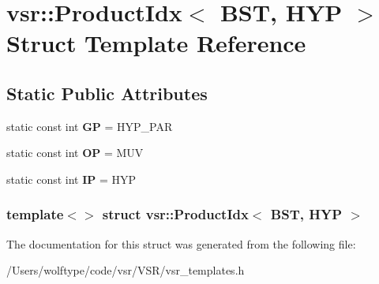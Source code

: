 \hypertarget{structvsr_1_1_product_idx_3_01_b_s_t_00_01_h_y_p_01_4}{\section{vsr\-:\-:Product\-Idx$<$ B\-S\-T, H\-Y\-P $>$ Struct Template Reference}
\label{structvsr_1_1_product_idx_3_01_b_s_t_00_01_h_y_p_01_4}
}
\subsection*{Static Public Attributes}
\begin{DoxyCompactItemize}
\item 
\hypertarget{structvsr_1_1_product_idx_3_01_b_s_t_00_01_h_y_p_01_4_abbcdeae2b8112d313e296b77e7db6af8}{static const int {\bfseries G\-P} = H\-Y\-P\-\_\-\-P\-A\-R}\label{structvsr_1_1_product_idx_3_01_b_s_t_00_01_h_y_p_01_4_abbcdeae2b8112d313e296b77e7db6af8}

\item 
\hypertarget{structvsr_1_1_product_idx_3_01_b_s_t_00_01_h_y_p_01_4_a0eb408c7926f741c1e2ba0eeba39f932}{static const int {\bfseries O\-P} = M\-U\-V}\label{structvsr_1_1_product_idx_3_01_b_s_t_00_01_h_y_p_01_4_a0eb408c7926f741c1e2ba0eeba39f932}

\item 
\hypertarget{structvsr_1_1_product_idx_3_01_b_s_t_00_01_h_y_p_01_4_a0a3de90c21991f428b1f8947fb6765b9}{static const int {\bfseries I\-P} = H\-Y\-P}\label{structvsr_1_1_product_idx_3_01_b_s_t_00_01_h_y_p_01_4_a0a3de90c21991f428b1f8947fb6765b9}

\end{DoxyCompactItemize}
\subsubsection*{template$<$$>$ struct vsr\-::\-Product\-Idx$<$ B\-S\-T, H\-Y\-P $>$}



The documentation for this struct was generated from the following file\-:\begin{DoxyCompactItemize}
\item 
/\-Users/wolftype/code/vsr/\-V\-S\-R/vsr\-\_\-templates.\-h\end{DoxyCompactItemize}
